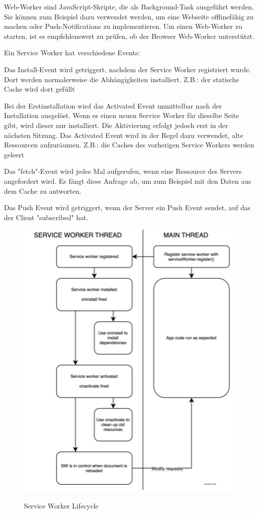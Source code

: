 
Web-Worker sind JavaScript-Skripte, die als Background-Task ausgeführt werden. Sie können zum Beispiel dazu verwendet werden, um eine Webseite offlinefähig zu machen oder Push-Notifications zu implementieren.  Um einen Web-Worker zu starten, ist es empfehlenswert zu prüfen, ob der Browser Web-Worker unterstützt.

Ein Service Worker hat verschiedene Events: 


Das Install-Event wird getriggert, nachdem der Service Worker registriert wurde. Dort werden normalerweise die Abhängigkeiten installiert. Z.B.: der statische Cache wird dort gefüllt 


Bei der Erstinstallation wird das Activated Event unmittelbar nach der Installation ausgelöst. Wenn es einen neuen Service Worker für dieselbe Seite gibt, wird dieser nur installiert. Die Aktivierung erfolgt jedoch erst in der nächsten Sitzung. Das Activated Event wird in der Regel dazu verwendet, alte Ressourcen aufzuräumen. Z.B.: die Caches des vorherigen Service Workers werden geleert


Das "fetch"-Event wird jedes Mal aufgerufen, wenn eine Ressource des Servers angefordert wird. Es fängt diese Anfrage ab, um zum Beispiel mit den Daten aus dem Cache zu antworten.


Das Push Event wird getriggert, wenn der Server ein Push Event sendet, auf das der Client "subscribed" hat.

\begin{figure}[h]
    \centering
    \includegraphics{media/ServiceWorker/lifecycle.png}
    \caption{Service Worker Lifecycle}
    \cite{MDNCacheAPI}
\end{figure}

